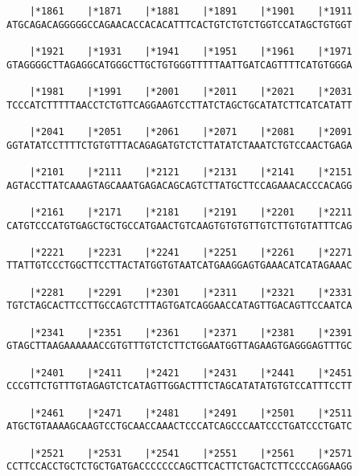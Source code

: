 \documentclass{article}
\begin{document}
\begin{Verbatim}
    |*1861    |*1871    |*1881    |*1891    |*1901    |*1911
ATGCAGACAGGGGGCCAGAACACCACACATTTCACTGTCTGTCTGGTCCATAGCTGTGGT
                                                            
    |*1921    |*1931    |*1941    |*1951    |*1961    |*1971
GTAGGGGCTTAGAGGCATGGGCTTGCTGTGGGTTTTTAATTGATCAGTTTTCATGTGGGA
                                                            
    |*1981    |*1991    |*2001    |*2011    |*2021    |*2031
TCCCATCTTTTTAACCTCTGTTCAGGAAGTCCTTATCTAGCTGCATATCTTCATCATATT
                                                            
    |*2041    |*2051    |*2061    |*2071    |*2081    |*2091
GGTATATCCTTTTCTGTGTTTACAGAGATGTCTCTTATATCTAAATCTGTCCAACTGAGA
                                                            
    |*2101    |*2111    |*2121    |*2131    |*2141    |*2151
AGTACCTTATCAAAGTAGCAAATGAGACAGCAGTCTTATGCTTCCAGAAACACCCACAGG
                                                            
    |*2161    |*2171    |*2181    |*2191    |*2201    |*2211
CATGTCCCATGTGAGCTGCTGCCATGAACTGTCAAGTGTGTGTTGTCTTGTGTATTTCAG
                                                            
    |*2221    |*2231    |*2241    |*2251    |*2261    |*2271
TTATTGTCCCTGGCTTCCTTACTATGGTGTAATCATGAAGGAGTGAAACATCATAGAAAC
                                                            
    |*2281    |*2291    |*2301    |*2311    |*2321    |*2331
TGTCTAGCACTTCCTTGCCAGTCTTTAGTGATCAGGAACCATAGTTGACAGTTCCAATCA
                                                            
    |*2341    |*2351    |*2361    |*2371    |*2381    |*2391
GTAGCTTAAGAAAAAACCGTGTTTGTCTCTTCTGGAATGGTTAGAAGTGAGGGAGTTTGC
                                                            
    |*2401    |*2411    |*2421    |*2431    |*2441    |*2451
CCCGTTCTGTTTGTAGAGTCTCATAGTTGGACTTTCTAGCATATATGTGTCCATTTCCTT
                                                            
    |*2461    |*2471    |*2481    |*2491    |*2501    |*2511
ATGCTGTAAAAGCAAGTCCTGCAACCAAACTCCCATCAGCCCAATCCCTGATCCCTGATC
                                                            
    |*2521    |*2531    |*2541    |*2551    |*2561    |*2571
CCTTCCACCTGCTCTGCTGATGACCCCCCCAGCTTCACTTCTGACTCTTCCCCAGGAAGG
                                                            

\end{Verbatim}
\end{document}
